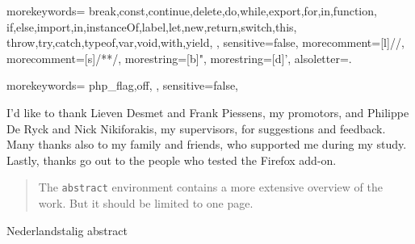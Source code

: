 \documentclass[master=cws,masteroption=english]{kulemt}
\begin{document}
 {
    morekeywords={
        break,const,continue,delete,do,while,export,for,in,function,
        if,else,import,in,instanceOf,label,let,new,return,switch,this,
        throw,try,catch,typeof,var,void,with,yield,
        },
    sensitive=false,
    morecomment=[l]{//},
    morecomment=[s]{/*}{*/},
    morestring=[b]",
    morestring=[d]',
    alsoletter={.}
}

 {
    morekeywords={
        php_flag,off,
        },
    sensitive=false,
}


\begin{preface}
I'd like to thank Lieven Desmet and Frank Piessens, my promotors, and Philippe De Ryck and Nick Nikiforakis, my supervisors, for suggestions and feedback. Many thanks also to my family and friends, who supported me during my study. Lastly, thanks go out to the people who tested the Firefox add-on.
\end{preface}

\tableofcontents*

\begin{abstract}
The \texttt{abstract} environment contains a more extensive overview of
the work. But it should be limited to one page.
\end{abstract}

\begin{abstract*}
Nederlandstalig abstract
\end{abstract*}

\listoffiguresandtables

\printglossaries

\mainmatter







\backmatter

\end{document}
